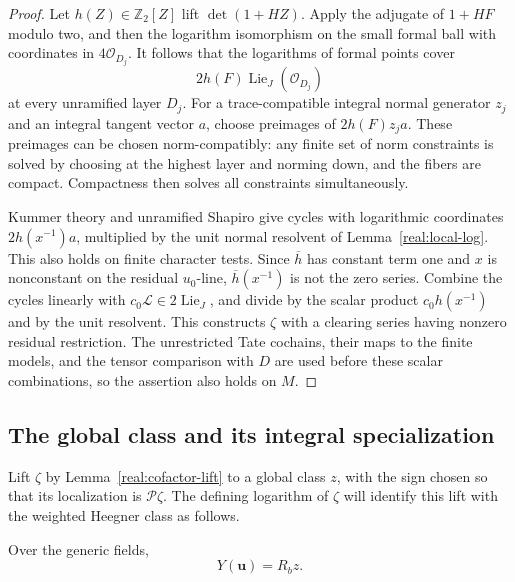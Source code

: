 \begin{proof}
Let \(h(Z)\in\mathbb Z_2[Z]\) lift \(\det(1+HZ)\). Apply the
adjugate of \(1+HF\) modulo two, and then the logarithm isomorphism
on the small formal ball with coordinates in \(4\mathcal O_{D_j}\).
It follows that the logarithms of formal points cover
\[
 2h(F)\operatorname{Lie}_J(\mathcal O_{D_j})
\]
at every unramified layer \(D_j\). For a trace-compatible integral
normal generator \(z_j\) and an integral tangent vector \(a\),
choose preimages of \(2h(F)z_ja\). These preimages can be chosen
norm-compatibly: any finite set of norm constraints is solved by
choosing at the highest layer and norming down, and the fibers are
compact. Compactness then solves all constraints simultaneously.

Kummer theory and unramified Shapiro give cycles with logarithmic
coordinates \(2h(x^{-1})a\), multiplied by the unit normal
resolvent of Lemma~\ref{real:local-log}. This also holds on finite
character tests. Since \(\overline h\) has constant term one and
\(x\) is nonconstant on the residual \(u_0\)-line,
\(\overline h(x^{-1})\) is not the zero series. Combine the cycles
linearly with \(c_0\mathcal L\in2\operatorname{Lie}_J\), and divide
by the scalar product \(c_0h(x^{-1})\) and by the unit resolvent.
This constructs \(\zeta\) with a clearing series having nonzero
residual restriction. The unrestricted Tate cochains, their maps to
the finite models, and the tensor comparison with \(D\) are used
before these scalar combinations, so the assertion also holds on
\(M\).
\end{proof}

\subsection{The global class and its integral specialization}

Lift \(\zeta\) by Lemma~\ref{real:cofactor-lift} to a global class
\(z\), with the sign chosen so that its localization is
\(\mathcal P\zeta\). The defining logarithm of \(\zeta\) will
identify this lift with the weighted Heegner class as follows.

\begin{proposition}\label{real:heegner-identity}
Over the generic fields,
\[
                             Y(\mathbf u)=R_b z .                     \tag{R5}\label{eq:R5}
\]
\end{proposition}

